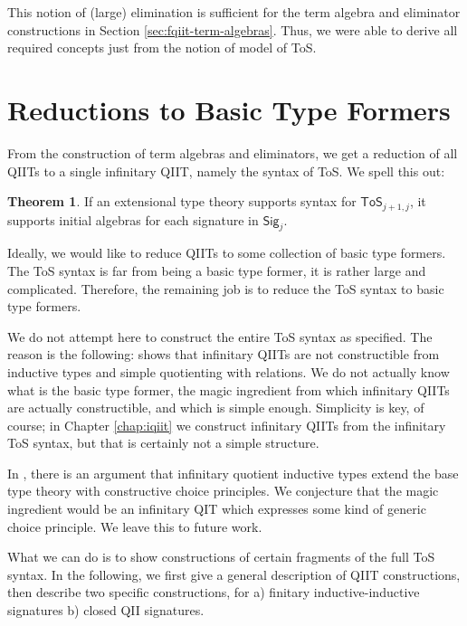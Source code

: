 \documentclass[12pt,a4paper,twoside,openany]{book}
\theoremstyle{remark}
\theoremstyle{definition}
\theoremstyle{theorem}
\newtheorem{theorem}{Theorem}
\newcommand{\ToS}{\mathsf{ToS}}
\newcommand{\Sig}{\mathsf{Sig}}
\begin{document}
This notion of (large) elimination is sufficient for the term algebra and
eliminator constructions in Section \ref{sec:fqiit-term-algebras}. Thus, we were
able to derive all required concepts just from the notion of model of ToS.

\section{Reductions to Basic Type Formers}
\label{sec:finitary-reductions}

From the construction of term algebras and eliminators, we get a reduction of
all QIITs to a single infinitary QIIT, namely the syntax of ToS. We spell this out:

\begin{theorem} If an extensional type theory supports syntax for $\ToS_{j+1,j}$, it supports
initial algebras for each signature in $\Sig_j$.
\end{theorem}

Ideally, we would like to reduce QIITs to some collection of basic type
formers. The ToS syntax is far from being a basic type former, it is rather
large and complicated. Therefore, the remaining job is to reduce the ToS syntax
to basic type formers.

We do not attempt here to construct the entire ToS syntax as specified. The
reason is the following: \cite[Section 9]{lumsdaineShulman} shows that
infinitary QIITs are not constructible from inductive types and simple
quotienting with relations. We do not actually know what is the basic type
former, the magic ingredient from which infinitary QIITs are actually
constructible, and which is simple enough. Simplicity is key, of course; in
Chapter \ref{chap:iqiit} we construct infinitary QIITs from the infinitary ToS
syntax, but that is certainly not a simple structure.

In \cite[Section~2.2]{ttintt}, there is an argument that infinitary quotient
inductive types extend the base type theory with constructive choice
principles. We conjecture that the magic ingredient would be an infinitary QIT
which expresses some kind of generic choice principle. We leave this to future
work.

What we can do is to show constructions of certain fragments of the full ToS
syntax. In the following, we first give a general description of QIIT constructions,
then describe two specific constructions, for a) finitary inductive-inductive signatures
b) closed QII signatures.
\end{document}
